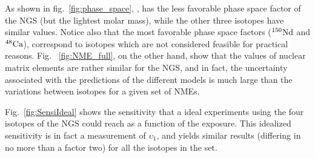 As shown in fig.~\ref{fig:phase_space}, 
, has the less favorable phase space factor of the NGS (but the lightest molar mass), while the other three isotopes have similar values. Notice also that the most favorable phase space factors (${\rm ^{150}Nd}$ and ${\rm ^{48}Ca}$), correspond to isotopes which are not considered feasible for practical reasons.   
Fig.~ \ref{fig:NME_full}, on the other hand, show that the values of nuclear matrix elements are rather similar for the NGS, and in fact, the uncertainty associated with the predictions of the different models is much large than the variations between isotopes for a given set of NMEs. 

Fig.~\ref{fig:SensiIdeal} shows the sensitivity that a ideal experiments using the four isotopes of the NGS could reach as a function of the exposure. This idealized  sensitivity is in fact a measurement of $\upsilon_1$, and yields similar results (differing in no more than a factor two) for all the isotopes in the set.

 

